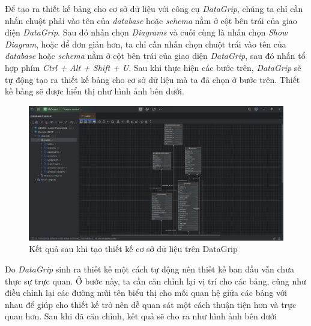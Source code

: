 \hspace*{1cm}
Để tạo ra thiết kế bảng cho cơ sở dữ liệu với công cụ \textit{DataGrip}, chúng ta chỉ cần nhấn chuột phải vào tên của \textit{database} hoặc \textit{schema} nằm ở cột bên trái của giao diện \textit{DataGrip}. Sau đó nhấn chọn \textit{Diagrams} và cuối cùng là nhấn chọn \textit{Show Diagram}, hoặc để đơn giản hơn, ta chỉ cần nhấn chọn chuột trái vào tên của \textit{database} hoặc \textit{schema} nằm ở cột bên trái của giao diện \textit{DataGrip}, sau đó nhấn tổ hợp phím \textit{Ctrl + Alt + Shift + U}. Sau khi thực hiện các bước trên, \textit{DataGrip} sẽ tự động tạo ra thiết kế bảng cho cơ sở dữ liệu mà ta đã chọn ở bước trên. Thiết kế bảng sẽ được hiển thị như hình ảnh bên dưới.
\begin{figure}[H]
    \centering
    \includegraphics[width=1\textwidth]{Images/Database/ShowDiagram.png}
    \caption{Kết quả sau khi tạo thiết kế cơ sở dữ liệu trên DataGrip}
\end{figure}
\hspace*{1cm}
Do \textit{DataGrip} sinh ra thiết kế một cách tự động nên thiết kế ban đầu vẫn chưa thực sự trực quan. Ở bước này, ta cần căn chỉnh lại vị trí cho các bảng, cũng như điều chỉnh lại các đường mũi tên biểu thị cho mối quan hệ giữa các bảng với nhau để giúp cho thiết kế trở nên dễ quan sát một cách thuận tiện hơn và trực quan hơn. Sau khi đã căn chỉnh, kết quả sẽ cho ra như hình ảnh bên dưới
